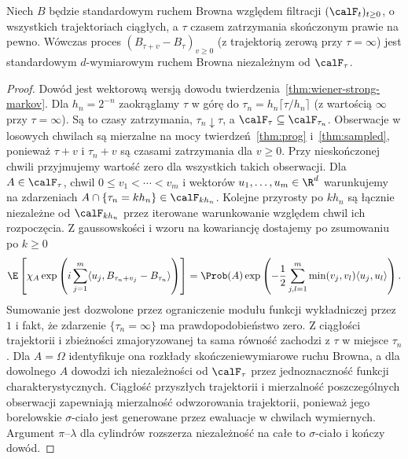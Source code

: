 \begin{twierdzenie}
\label{thm:brown-multi-strong}
Niech $B$ będzie standardowym ruchem Browna względem
filtracji $(\calF_t)_{t\ge0}$, o wszystkich trajektoriach
ciągłych, a $\tau$ czasem zatrzymania skończonym prawie
na pewno. Wówczas proces
$(B_{\tau+v}-B_\tau)_{v\ge0}$ (z trajektorią zerową
przy $\tau=\infty$) jest standardowym $d$-wymiarowym
ruchem Browna niezależnym od $\calF_\tau$.
\end{twierdzenie}
\begin{proof}
Dowód jest wektorową wersją dowodu
twierdzenia~\ref{thm:wiener-strong-markov}.
Dla $h_n=2^{-n}$ zaokrąglamy $\tau$ w górę do
$\tau_n=h_n\lceil\tau/h_n\rceil$ (z wartością
$\infty$ przy $\tau=\infty$). Są to czasy zatrzymania,
$\tau_n\downarrow\tau$, a $\calF_\tau\subseteq\calF_{\tau_n}$.
Obserwacje w losowych chwilach są mierzalne na mocy
twierdzeń~\ref{thm:prog} i~\ref{thm:sampled}, ponieważ
$\tau+v$ i $\tau_n+v$ są czasami zatrzymania dla $v\ge0$.
Przy nieskończonej chwili przyjmujemy wartość zero
dla wszystkich takich obserwacji.
Dla $A\in\calF_\tau$, chwil $0\le v_1<\cdots<v_m$
i wektorów $u_1,\ldots,u_m\in\R^d$ warunkujemy na
zdarzeniach $A\cap\{\tau_n=kh_n\}\in\calF_{kh_n}$.
Kolejne przyrosty po $kh_n$ są łącznie niezależne
od $\calF_{kh_n}$ przez iterowane warunkowanie
względem chwil ich rozpoczęcia. Z gaussowskości
i wzoru na kowariancję dostajemy po zsumowaniu
po $k\ge0$
\[
\E\left[\chi_A\exp\left(
i\sum_{j=1}^m\langle u_j,B_{\tau_n+v_j}-B_{\tau_n}\rangle
\right)\right]
=\Prob(A)\exp\left(
-\frac12\sum_{j,l=1}^m\min(v_j,v_l)\langle u_j,u_l\rangle
\right).
\]
Sumowanie jest dozwolone przez ograniczenie modułu
funkcji wykładniczej przez $1$ i fakt, że zdarzenie
$\{\tau_n=\infty\}$ ma prawdopodobieństwo zero.
Z ciągłości trajektorii i zbieżności zmajoryzowanej
ta sama równość zachodzi z $\tau$ w miejsce $\tau_n$.
Dla $A=\Omega$ identyfikuje ona rozkłady
skończeniewymiarowe ruchu Browna, a dla dowolnego
$A$ dowodzi ich niezależności od $\calF_\tau$
przez jednoznaczność funkcji charakterystycznych.
Ciągłość przyszłych trajektorii i mierzalność
poszczególnych obserwacji zapewniają mierzalność
odwzorowania trajektorii, ponieważ jego borelowskie
$\sigma$-ciało jest generowane przez ewaluacje
w chwilach wymiernych. Argument $\pi$--$\lambda$
dla cylindrów rozszerza niezależność na całe to
$\sigma$-ciało i kończy dowód.
\end{proof}

